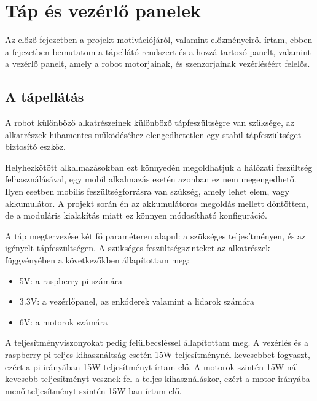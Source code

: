 \chapter{Táp és vezérlő panelek}

Az előző fejezetben a projekt motivációjáról, valamint előzményeiről írtam,
ebben a fejezetben bemutatom a tápellátó rendszert és a hozzá tartozó panelt,
valamint a vezérlő panelt, amely a robot motorjainak, és szenzorjainak
vezérléséért felelős.


\section{A tápellátás}

A robot különböző alkatrészeinek különböző tápfeszültségre van szüksége, az
alkatrészek hibamentes működéséhez elengedhetetlen egy stabil tápfeszültséget
biztosító eszköz.

Helyhezkötött alkalmazásokban ezt könnyedén megoldhatjuk a hálózati feszültség
felhasználásával, egy mobil alkalmazás esetén azonban ez nem megengedhető. Ilyen
esetben mobilis feszültségforrásra van szükség, amely lehet elem, vagy
akkumulátor. A projekt során én az akkumulátoros megoldás mellett döntöttem, de
a moduláris kialakítás miatt ez könnyen módosítható konfiguráció.

A táp megtervezése két fő paraméteren alapul: a szükséges teljesítményen, és az
igényelt tápfeszültségen. A szükséges feszültségszinteket az alkatrészek
függvényében a következőkben állapítottam meg:

\begin{itemize}
\item 5V: a raspberry pi számára
\item 3.3V: a vezérlőpanel, az enkóderek valamint a lidarok számára
\item 6V: a motorok számára
\end{itemize}

A teljesítményviszonyokat pedig felülbecsléssel állapítottam meg. A vezérlés és
a raspberry pi teljes kihasználtság esetén 15W teljesítménynél kevesebbet
fogyaszt, ezért a pi irányában 15W teljesítményt írtam elő. A motorok szintén
15W-nál kevesebb teljesítményt vesznek fel a teljes kihasználáskor, ezért a motor
irányába menő teljesítményt szintén 15W-ban írtam elő.

